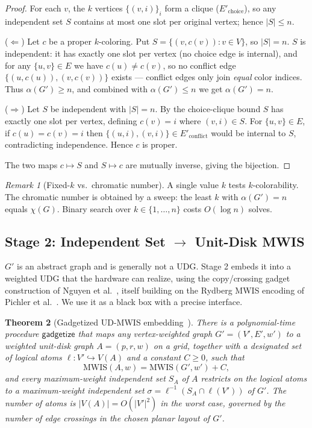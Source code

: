 \documentclass[11pt]{article}
\newtheorem{theorem}{Theorem}[section]
\theoremstyle{definition}
\theoremstyle{remark}
\newtheorem{remark}[theorem]{Remark}
\newcommand{\MWIS}{\mathrm{MWIS}}
\newcommand{\indep}{\alpha}
\begin{document}
\begin{proof}
For each $v$, the $k$ vertices $\{(v,i)\}_i$ form a clique
($E'_{\mathrm{choice}}$), so any independent set $S$ contains at most one slot per
original vertex; hence $|S|\le n$.

($\Leftarrow$) Let $c$ be a proper $k$-coloring. Put
$S=\{(v,c(v)):v\in V\}$, so $|S|=n$. $S$ is independent: it has exactly one slot
per vertex (no choice edge is internal), and for any $\{u,v\}\in E$ we have
$c(u)\ne c(v)$, so no conflict edge $\{(u,c(u)),(v,c(v))\}$ exists --- conflict
edges only join \emph{equal} color indices. Thus $\indep(G')\ge n$, and combined
with $\indep(G')\le n$ we get $\indep(G')=n$.

($\Rightarrow$) Let $S$ be independent with $|S|=n$. By the choice-clique bound $S$
has exactly one slot per vertex, defining $c(v)=i$ where $(v,i)\in S$. For
$\{u,v\}\in E$, if $c(u)=c(v)=i$ then $\{(u,i),(v,i)\}\in E'_{\mathrm{conflict}}$
would be internal to $S$, contradicting independence. Hence $c$ is proper.

The two maps $c\mapsto S$ and $S\mapsto c$ are mutually inverse, giving the
bijection.
\end{proof}

\begin{remark}[Fixed-$k$ vs.\ chromatic number]
A single value $k$ tests $k$-colorability. The chromatic number is obtained by a
sweep: the least $k$ with $\indep(G')=n$ equals $\chi(G)$. Binary search over
$k\in\{1,\dots,n\}$ costs $O(\log n)$ solves.
\end{remark}

\subsection{Stage 2: Independent Set $\to$ Unit-Disk MWIS}
\label{sec:gadgetize}

$G'$ is an abstract graph and is generally not a UDG. Stage 2 embeds it into a
weighted UDG that the hardware can realize, using the copy/crossing gadget
construction of Nguyen et al.~\cite{Nguyen2023}, itself building on the Rydberg
MWIS encoding of Pichler et al.~\cite{Pichler2018}. We use it as a black box with
a precise interface.

\begin{theorem}[Gadgetized UD-MWIS embedding~\cite{Nguyen2023}]
\label{thm:gadget}
There is a polynomial-time procedure $\mathsf{gadgetize}$ that maps any vertex-weighted
graph $G'=(V',E',w')$ to a weighted unit-disk graph $A=(p,r,w)$ on a grid, together
with a designated set of \emph{logical} atoms $\ell:V'\hookrightarrow V(A)$ and a
constant $C\ge 0$, such that
\[
  \MWIS(A,w) = \MWIS(G',w') + C,
\]
and every maximum-weight independent set $S_A$ of $A$ restricts on the logical
atoms to a maximum-weight independent set $\sigma=\ell^{-1}(S_A\cap \ell(V'))$ of
$G'$. The number of atoms is $|V(A)| = O\!\left(|V'|^2\right)$ in the worst case,
governed by the number of edge crossings in the chosen planar layout of $G'$.
\end{theorem}
\end{document}
